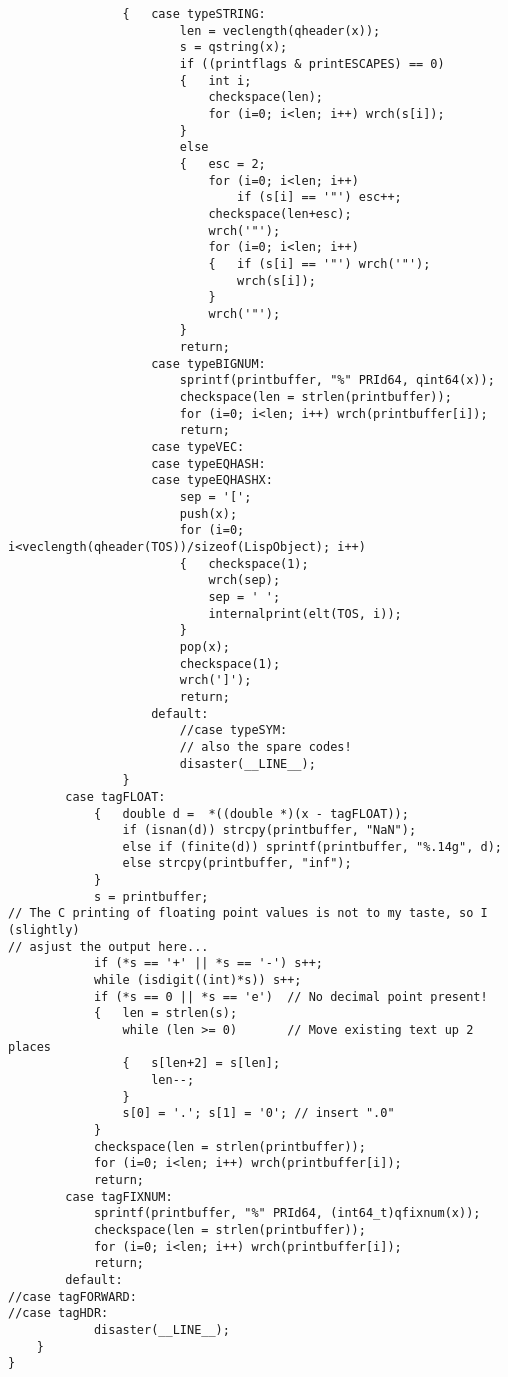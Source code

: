 {\begin{verbatim}
                {   case typeSTRING:
                        len = veclength(qheader(x));
                        s = qstring(x);
                        if ((printflags & printESCAPES) == 0)
                        {   int i;
                            checkspace(len);
                            for (i=0; i<len; i++) wrch(s[i]);
                        }
                        else
                        {   esc = 2;
                            for (i=0; i<len; i++)
                                if (s[i] == '"') esc++;
                            checkspace(len+esc);
                            wrch('"');
                            for (i=0; i<len; i++)
                            {   if (s[i] == '"') wrch('"');
                                wrch(s[i]);
                            }
                            wrch('"');
                        }
                        return;
                    case typeBIGNUM:
                        sprintf(printbuffer, "%" PRId64, qint64(x));
                        checkspace(len = strlen(printbuffer));
                        for (i=0; i<len; i++) wrch(printbuffer[i]);
                        return;
                    case typeVEC:
                    case typeEQHASH:
                    case typeEQHASHX:
                        sep = '[';
                        push(x);
                        for (i=0; i<veclength(qheader(TOS))/sizeof(LispObject); i++)
                        {   checkspace(1);
                            wrch(sep);
                            sep = ' ';
                            internalprint(elt(TOS, i));
                        }
                        pop(x);
                        checkspace(1);
                        wrch(']');
                        return;
                    default:
                        //case typeSYM:
                        // also the spare codes!
                        disaster(__LINE__);
                }
        case tagFLOAT:
            {   double d =  *((double *)(x - tagFLOAT));
                if (isnan(d)) strcpy(printbuffer, "NaN");
                else if (finite(d)) sprintf(printbuffer, "%.14g", d);
                else strcpy(printbuffer, "inf");
            }
            s = printbuffer;
// The C printing of floating point values is not to my taste, so I (slightly)
// asjust the output here...
            if (*s == '+' || *s == '-') s++;
            while (isdigit((int)*s)) s++;
            if (*s == 0 || *s == 'e')  // No decimal point present!
            {   len = strlen(s);
                while (len >= 0)       // Move existing text up 2 places
                {   s[len+2] = s[len];
                    len--;
                }
                s[0] = '.'; s[1] = '0'; // insert ".0"
            }
            checkspace(len = strlen(printbuffer));
            for (i=0; i<len; i++) wrch(printbuffer[i]);
            return;
        case tagFIXNUM:
            sprintf(printbuffer, "%" PRId64, (int64_t)qfixnum(x));
            checkspace(len = strlen(printbuffer));
            for (i=0; i<len; i++) wrch(printbuffer[i]);
            return;
        default:
//case tagFORWARD:
//case tagHDR:
            disaster(__LINE__);
    }
}


\end{verbatim}}
